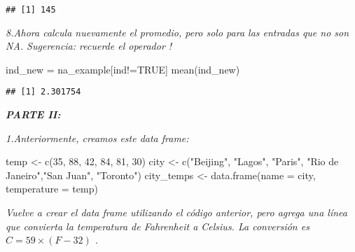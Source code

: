 \documentclass[
]{article}
\newenvironment{Shaded}{\begin{snugshade}}{\end{snugshade}}
\newcommand{\AttributeTok}[1]{\textcolor[rgb]{0.77,0.63,0.00}{#1}}
\newcommand{\ConstantTok}[1]{\textcolor[rgb]{0.00,0.00,0.00}{#1}}
\newcommand{\DecValTok}[1]{\textcolor[rgb]{0.00,0.00,0.81}{#1}}
\newcommand{\FunctionTok}[1]{\textcolor[rgb]{0.00,0.00,0.00}{#1}}
\newcommand{\NormalTok}[1]{#1}
\newcommand{\OtherTok}[1]{\textcolor[rgb]{0.56,0.35,0.01}{#1}}
\newcommand{\SpecialCharTok}[1]{\textcolor[rgb]{0.00,0.00,0.00}{#1}}
\newcommand{\StringTok}[1]{\textcolor[rgb]{0.31,0.60,0.02}{#1}}
\begin{document}
\begin{verbatim}
## [1] 145
\end{verbatim}

\emph{8.Ahora calcula nuevamente el promedio, pero solo para las
entradas que no son NA. Sugerencia: recuerde el operador !}

\begin{Shaded}
\begin{Highlighting}[]
\NormalTok{ind\_new }\OtherTok{=}\NormalTok{ na\_example[ind}\SpecialCharTok{!=}\ConstantTok{TRUE}\NormalTok{]}
\FunctionTok{mean}\NormalTok{(ind\_new)}
\end{Highlighting}
\end{Shaded}

\begin{verbatim}
## [1] 2.301754
\end{verbatim}

\textbf{\emph{PARTE II:}}

\emph{1.Anteriormente, creamos este data frame:}

\begin{Shaded}
\begin{Highlighting}[]
\NormalTok{temp }\OtherTok{\textless{}{-}} \FunctionTok{c}\NormalTok{(}\DecValTok{35}\NormalTok{, }\DecValTok{88}\NormalTok{, }\DecValTok{42}\NormalTok{, }\DecValTok{84}\NormalTok{, }\DecValTok{81}\NormalTok{, }\DecValTok{30}\NormalTok{)}
\NormalTok{city }\OtherTok{\textless{}{-}} \FunctionTok{c}\NormalTok{(}\StringTok{"Beijing"}\NormalTok{, }\StringTok{"Lagos"}\NormalTok{, }\StringTok{"Paris"}\NormalTok{, }\StringTok{"Rio de Janeiro"}\NormalTok{,}\StringTok{"San Juan"}\NormalTok{, }\StringTok{"Toronto"}\NormalTok{)}
\NormalTok{city\_temps }\OtherTok{\textless{}{-}} \FunctionTok{data.frame}\NormalTok{(}\AttributeTok{name =}\NormalTok{ city, }\AttributeTok{temperature =}\NormalTok{ temp)}
\end{Highlighting}
\end{Shaded}

\emph{Vuelve a crear el data frame utilizando el código anterior, pero
agrega una línea que convierta la temperatura de Fahrenheit a Celsius.
La conversión es \(C=59×(F−32)\) .}
\end{document}
